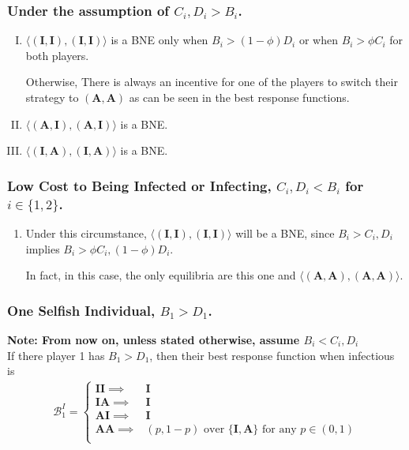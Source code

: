 \documentclass{article}
\theoremstyle{definition}
\theoremstyle{exercise}
\theoremstyle{remark}
\begin{document}
\subsubsection*{Under the assumption of $C_i, D_i > B_i$.}
\begin{enumerate}[I.]
    \item $ \langle (\bm{I}, \bm{I}), (\bm{I}, \bm{I}) \rangle$ is a BNE only when $B_i > (1 - \phi)D_i$ or when $B_i > \phi C_i$ for both players. 
        
        Otherwise, There is always an incentive for one of the players to switch their strategy to $(\bm{A}, \bm{A})$ as can be seen in the best response functions.


\item $\langle (\bm{A}, \bm{I}), (\bm{A}, \bm{I}) \rangle$ is a BNE. 

\item $\langle (\bm{I}, \bm{A}), (\bm{I}, \bm{A}) \rangle$ is a BNE.

\end{enumerate}
\subsubsection*{Low Cost to Being Infected or Infecting, $C_i, D_i < B_i$ for $i \in \{1,2\}$.}
\begin{enumerate}[(1).]
    \item Under this circumstance, $\langle (\bm{I}, \bm{I}), (\bm{I}, \bm{I}) \rangle$ will be a BNE, since $B_i > C_i, D_i$ implies $B_i > \phi C_i, (1 - \phi)D_i$.

        In fact, in this case, the only equilibria are this one and $\langle (\bm{A},\bm{A}), (\bm{A},\bm{A}) \rangle$.%
\end{enumerate}


\subsubsection*{One Selfish Individual, $ B_1 > D_1$.}
\textbf{Note: From now on, unless stated otherwise, assume $B_i < C_i, D_i$}\\
%
If there player 1 has $B_1 > D_1$, then their best response function when infectious is
\begin{align*}
    \mathcal{B}^{I}_1 = \begin{cases}
         \bm{II} \implies& \bm{I}\\
         \bm{IA}\implies& \bm{I}  \\
         \bm{AI}\implies& \bm{I}  \\
         \bm{AA}\implies& \text{$(p, 1 - p)$ over $\{ \bm{I}, \bm{A}\}$ for any $p \in (0,1)$} \\
    \end{cases}
\end{align*}
\end{document}
